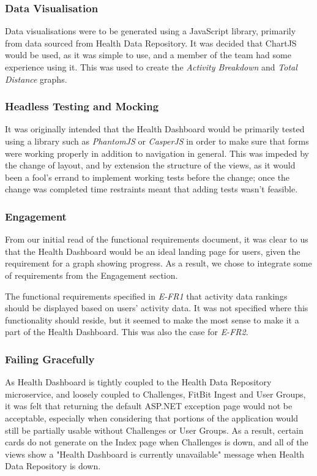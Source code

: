 \subsubsection{Data Visualisation}
\par
Data visualisations were to be generated using a JavaScript library, primarily from data sourced from Health Data Repository. It was decided that ChartJS\cite{chartjs} would be used, as it was simple to use, and a member of the team had some experience using it. This was used to create the \textit{Activity Breakdown} and \textit{Total Distance} graphs.

\subsubsection{Headless Testing and Mocking}
\par
It was originally intended that the Health Dashboard would be primarily tested using a library such as \textit{PhantomJS} or \textit{CasperJS} in order to make sure that forms were working properly in addition to navigation in general. This was impeded by the change of layout, and by extension the structure of the views, as it would been a fool's errand to implement working tests before the change; once the change was completed time restraints meant that adding tests wasn't feasible.

\subsubsection{Engagement}
\par
From our initial read of the functional requirements document, it was clear to us that the Health Dashboard would be an ideal landing page for users, given the requirement for a graph showing progress. As a result, we chose to integrate some of requirements from the Engagement section.

\par
The functional requirements specified in \textit{E-FR1} that activity data rankings should be displayed based on users' activity data. It was not specified where this functionality should reside, but it seemed to make the most sense to make it a part of the Health Dashboard. This was also the case for \textit{E-FR2}.

\subsubsection{Failing Gracefully}
\par
As Health Dashboard is tightly coupled to the Health Data Repository microservice, and loosely coupled to Challenges, FitBit Ingest and User Groups, it was felt that returning the default ASP.NET exception page would not be acceptable, especially when considering that portions of the application would still be partially usable without Challenges or User Groups. As a result, certain cards do not generate on the Index page when Challenges is down, and all of the views show a "Health Dashboard is currently unavailable" message when Health Data Repository is down.